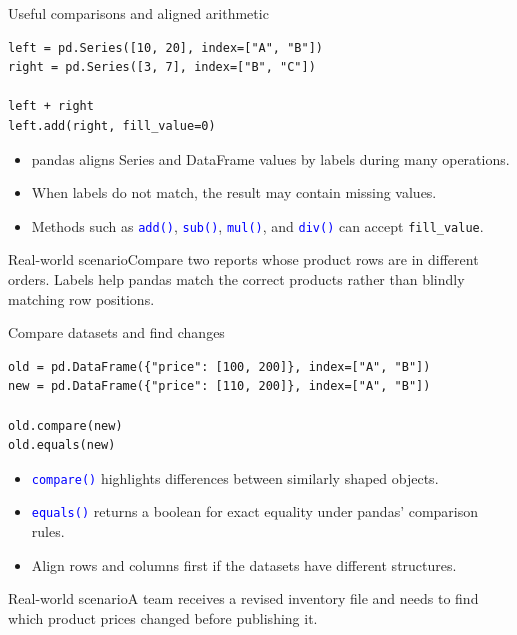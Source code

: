 \documentclass[aspectratio=169,10pt]{beamer}
\newcommand{\scenario}[1]{\begin{block}{Real-world scenario}#1\end{block}}
\newcommand{\method}[1]{\texttt{\textcolor{Blue}{#1}}}
\begin{document}
\begin{frame}[fragile]{Useful comparisons and aligned arithmetic}
\begin{lstlisting}
left = pd.Series([10, 20], index=["A", "B"])
right = pd.Series([3, 7], index=["B", "C"])

left + right
left.add(right, fill_value=0)
\end{lstlisting}
\begin{itemize}
\item pandas aligns Series and DataFrame values by labels during many operations.
\item When labels do not match, the result may contain missing values.
\item Methods such as \method{add()}, \method{sub()}, \method{mul()}, and \method{div()} can accept \texttt{fill\_value}.
\end{itemize}
\scenario{Compare two reports whose product rows are in different orders. Labels help pandas match the correct products rather than blindly matching row positions.}
\end{frame}

\begin{frame}[fragile]{Compare datasets and find changes}
\begin{lstlisting}
old = pd.DataFrame({"price": [100, 200]}, index=["A", "B"])
new = pd.DataFrame({"price": [110, 200]}, index=["A", "B"])

old.compare(new)
old.equals(new)
\end{lstlisting}
\begin{itemize}
\item \method{compare()} highlights differences between similarly shaped objects.
\item \method{equals()} returns a boolean for exact equality under pandas' comparison rules.
\item Align rows and columns first if the datasets have different structures.
\end{itemize}
\scenario{A team receives a revised inventory file and needs to find which product prices changed before publishing it.}
\end{frame}
\end{document}
